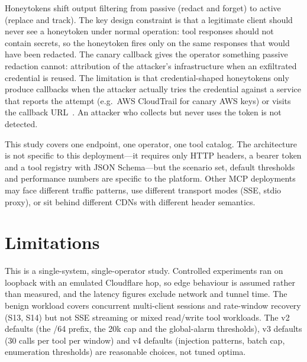 \documentclass[10pt,twocolumn]{article}
\begin{document}
Honeytokens shift output filtering from passive (redact and forget) to active
(replace and track). The key design constraint is that a legitimate client
should never see a honeytoken under normal operation: tool responses should
not contain secrets, so the honeytoken fires only on the same responses that
would have been redacted. The canary callback gives the operator something
passive redaction cannot: attribution of the attacker's infrastructure when
an exfiltrated credential is reused. The limitation is that credential-shaped
honeytokens only produce callbacks when the attacker actually tries the
credential against a service that reports the attempt (e.g.\ AWS CloudTrail
for canary AWS keys) or visits the callback URL~\citep{canarytokens}. An
attacker who collects but never uses the token is not detected.

This study covers one endpoint, one operator, one tool catalog. The
architecture is not specific to this deployment---it requires only HTTP
headers, a bearer token and a tool registry with JSON Schema---but the
scenario set, default thresholds and performance numbers are specific to the
platform. Other MCP deployments may face different traffic patterns, use
different transport modes (SSE, stdio proxy), or sit behind different CDNs
with different header semantics.

\section{Limitations}
This is a single-system, single-operator study. Controlled experiments ran on
loopback with an emulated Cloudflare hop, so edge behaviour is assumed rather
than measured, and the latency figures exclude network and tunnel time. The
benign workload covers concurrent multi-client sessions and rate-window
recovery (S13, S14) but not SSE streaming or mixed read/write tool workloads.
The v2 defaults (the /64 prefix, the 20k cap and the global-alarm thresholds),
v3 defaults (30 calls per tool per window) and v4 defaults (injection patterns,
batch cap, enumeration thresholds) are reasonable choices, not tuned optima.
\end{document}
